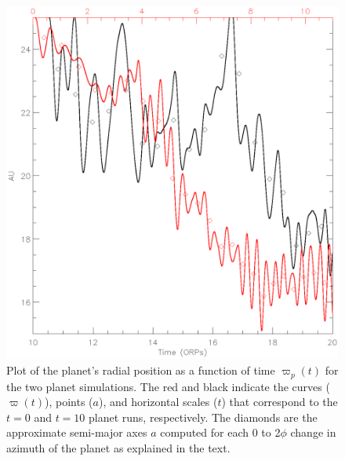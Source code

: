 \documentclass[12pt,manuscript,authoryear]{aastex}
\begin{document}
\begin{figure}[t]
\center
\includegraphics[width=12cm]{Figures/planeta.eps}
\caption{Plot of the planet's radial position as a function of time $\varpi_p(t)$ for the two planet simulations. The red and black indicate the curves ($\varpi(t)$), points ($a$), and horizontal scales ($t$) that correspond to the $t = 0$ and $t = 10$ planet runs, respectively. The diamonds are the approximate semi-major axes $a$ computed for each 0 to 2$\phi$ change in azimuth of the planet as explained in the text.}
\label{fig:a}
\end{figure}
\end{document}
